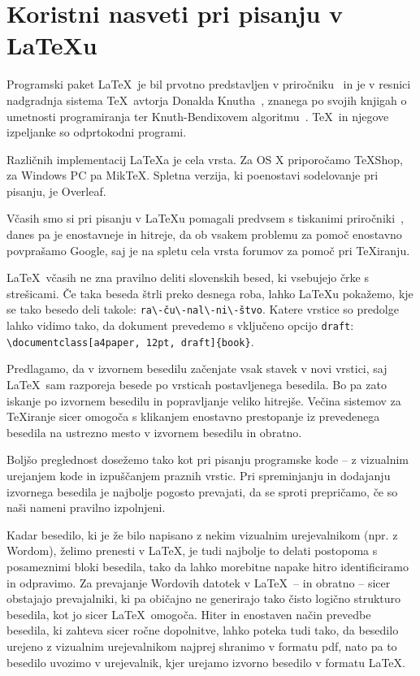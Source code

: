 \documentclass[a4paper,12pt,openright]{book}
\begin{document}
\chapter{Koristni nasveti pri pisanju v \LaTeX{u}}
\label{latex}

Programski paket \LaTeX\ je bil prvotno predstavljen v priročniku~\cite{lamport} in je v resnici nadgradnja sistema \TeX\ avtorja Donalda Knutha~\cite{knuth},
znanega po svojih knjigah o umetnosti programiranja
ter Knuth-Bendixovem algoritmu~\cite{knuth1983simple}.
\TeX\ in njegove izpeljanke so odprtokodni programi.

Različnih implementacij \LaTeX{}a je cela vrsta.
Za OS X priporočamo TeXShop, za Windows PC pa MikTeX.
Spletna verzija, ki poenostavi sodelovanje pri pisanju, je Overleaf.

Včasih smo si pri pisanju v \LaTeX{}u  pomagali predvsem s tiskanimi pri\-ro\-čni\-ki~\cite{lamport}, danes pa je enostavneje in hitreje, da ob vsakem problemu za pomoč enostavno povprašamo Google,
saj je na spletu cela vrsta forumov za pomoč pri \TeX iranju.

\LaTeX\ včasih ne zna pravilno deliti slovenskih besed, ki vsebujejo črke s streši\-ca\-mi.
Če taka beseda štrli preko desnega roba,  lahko \LaTeX{}u pokažemo, kje se tako besedo deli takole: \verb=ra\-ču\-nal\-ni\-štvo=.
Katere vrstice so predolge lahko vidimo tako, da dokument prevedemo s vključeno opcijo \texttt{draft}: \verb=\documentclass[a4paper, 12pt, draft]{book}=.

Predlagamo, da v izvornem besedilu začenjate vsak stavek v novi vrstici, saj \LaTeX\ sam razporeja besede po vrsticah postavljenega besedila.
Bo pa zato iskanje po izvornem besedilu in popravljanje veliko hitrejše.
Večina sistemov za \TeX{}iranje sicer omogoča s klikanjem enostavno prestopanje  iz prevedenega besedila na ustrezno mesto v izvornem besedilu in obratno.

Boljšo preglednost dosežemo tako kot pri pisanju programske kode -- z vizualnim urejanjem kode in izpuščanjem praznih vrstic.
Pri spreminjanju in dodajanju izvornega besedila je najbolje pogosto prevajati, da se sproti prepričamo, če so naši nameni pravilno izpolnjeni.

Kadar besedilo, ki je že bilo napisano z nekim vizualnim urejevalnikom (npr. z Wordom), želimo prenesti v \LaTeX, je tudi najbolje to delati postopoma s posameznimi bloki besedila,
tako da lahko morebitne napake hitro identificiramo in odpravimo.
Za prevajanje Wordovih datotek v \LaTeX\ -- in obratno -- sicer obstajajo prevajalniki, ki pa običajno ne generirajo tako čisto logično strukturo besedila, kot jo sicer \LaTeX\ omogoča.
Hiter in enostaven način prevedbe besedila, ki  zahteva sicer ročne dopolnitve, lahko poteka tudi tako, da besedilo urejeno z vizualnim urejevalnikom najprej shranimo v formatu pdf,
nato pa to besedilo uvozimo v urejevalnik, kjer urejamo izvorno besedilo v formatu \LaTeX.
\end{document}
